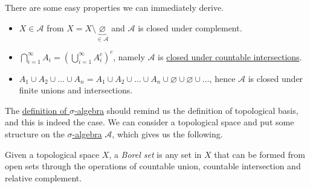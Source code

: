\begin{remark}
	There are some easy properties we can immediately derive.
	\begin{itemize}
		\item \(X\in \mathcal{A} \) from \(X = X\setminus \underbrace{\varnothing}_{\in \mathcal{A}} \) and \(\mathcal{A}\) is closed under complement.
		\item \(\bigcap\limits_{i=1}^{\infty} A_{i} = \left(\bigcup\limits_{i=1}^{\infty} A_{i}^{c} \right)^c\), namely \(\mathcal{A} \) is \underline{closed under countable intersections}.
		\item \(A_1\cup A_2 \cup \dots \cup A_n = A_1\cup A_2 \cup \dots \cup A_n \cup \varnothing \cup \varnothing \cup\dots\), hence \(\mathcal{A} \) is closed under finite unions and intersections.
	\end{itemize}
\end{remark}

\begin{note}
	The \hyperref[def:sigma-algebra]{definition of \(\sigma\)-algebra} should remind us the definition of topological basis, and this is indeed the case.
	We can consider a topological space and put some structure on the \hyperref[def:sigma-algebra]{\(\sigma\)-algebra} \(\mathcal{A} \),
	which gives us the following.
\end{note}

\begin{definition}\label{def:Borel-set}
	Given a topological space \(X\), a \emph{Borel set} is any set in \(X\) that can be formed from open sets through the operations of countable union, countable intersection and relative complement.
\end{definition}